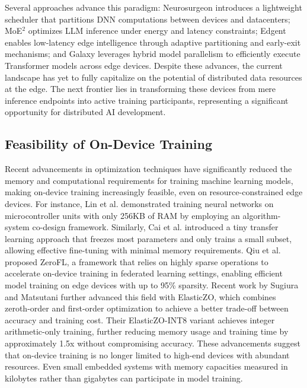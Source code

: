 Several approaches advance this paradigm: Neurosurgeon \cite{kang2017neurosurgeon} introduces a lightweight scheduler that partitions DNN computations between devices and datacenters; MoE$^2$ \cite{jin2025moe2} optimizes LLM inference under energy and latency constraints; Edgent \cite{li2018edgent} enables low-latency edge intelligence through adaptive partitioning and early-exit mechanisms; and Galaxy \cite{ye2024galaxy} leverages hybrid model parallelism to efficiently execute Transformer models across edge devices. Despite these advances, the current landscape has yet to fully capitalize on the potential of distributed data resources at the edge. The next frontier lies in transforming these devices from mere inference endpoints into active training participants, representing a significant opportunity for distributed AI development. 

\subsection{Feasibility of On-Device Training}

Recent advancements in optimization techniques have significantly reduced the memory and computational requirements for training machine learning models, making on-device training increasingly feasible, even on resource-constrained edge devices.
For instance, Lin et al. \cite{lin2022ondevice} demonstrated training neural networks on microcontroller units with only 256KB of RAM by employing an algorithm-system co-design framework. 
Similarly, Cai et al. \cite{cai2020tinytl} introduced a tiny transfer learning approach that freezes most parameters and only trains a small subset, allowing effective fine-tuning with minimal memory requirements. Qiu et al. \cite{qiu2022zerofl} proposed ZeroFL, a framework that relies on highly sparse operations to accelerate on-device training in federated learning settings, enabling efficient model training on edge devices with up to 95\% sparsity.
Recent work by Sugiura and Matsutani \cite{sugiura2025elasticzo} further advanced this field with ElasticZO, which combines zeroth-order and first-order optimization to achieve a better trade-off between accuracy and training cost. Their ElasticZO-INT8 variant achieves integer arithmetic-only training, further reducing memory usage and training time by approximately 1.5x without compromising accuracy.
These advancements suggest that on-device training is no longer limited to high-end devices with abundant resources. Even small embedded systems with memory capacities measured in kilobytes rather than gigabytes can participate in model training.
